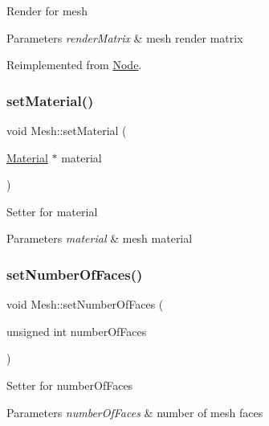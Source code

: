 Render for mesh 
\begin{DoxyParams}{Parameters}
{\em render\+Matrix} & mesh render matrix \\
\hline
\end{DoxyParams}


Reimplemented from \hyperlink{classNode_a7faebb78a04b6421dbf5afe998f7658d}{Node}.

\mbox{\label{classMesh_acee71afee77988e9233bee788ac501f3}} 
\subsubsection{\texorpdfstring{set\+Material()}{setMaterial()}}
{\footnotesize\ttfamily void Mesh\+::set\+Material (\begin{DoxyParamCaption}\item[{\hyperlink{classMaterial}{Material} $\ast$}]{material }\end{DoxyParamCaption})}

Setter for material 
\begin{DoxyParams}{Parameters}
{\em material} & mesh material \\
\hline
\end{DoxyParams}
\mbox{\label{classMesh_ad53ff995738c244717611c437db95462}} 
\subsubsection{\texorpdfstring{set\+Number\+Of\+Faces()}{setNumberOfFaces()}}
{\footnotesize\ttfamily void Mesh\+::set\+Number\+Of\+Faces (\begin{DoxyParamCaption}\item[{unsigned int}]{number\+Of\+Faces }\end{DoxyParamCaption})}

Setter for number\+Of\+Faces 
\begin{DoxyParams}{Parameters}
{\em number\+Of\+Faces} & number of mesh faces \\
\hline
\end{DoxyParams}
\mbox{\label{classMesh_a02add67a4d615f48594c2e70d15da2c8}} 
